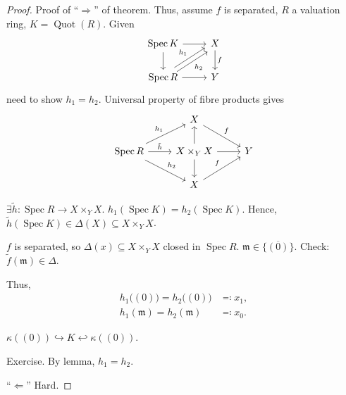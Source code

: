 \documentclass[12pt]{article}
\DeclareMathOperator{\Spec}{Spec}
\DeclareMathOperator{\Quot}{Quot}
\theoremstyle{definition}
\begin{document}
\begin{proof}
Proof of ``$\Rightarrow$'' of theorem. Thus, assume $f$ is separated, $R$ a valuation ring, $K=\Quot(R)$. Given
\[\begin{tikzcd}\Spec K\arrow[r]\arrow[d]&X\arrow[d,"f"]\\\Spec R\arrow[r]\arrow[ru,shift left,"h_1"]\arrow[ru,shift right,"h_2",swap]&Y\end{tikzcd}\]
need to show $h_1=h_2$. Universal property of fibre products gives
\[\begin{tikzcd}&X\arrow[rd,"f"]\\\Spec R\arrow[ru,"h_1"]\arrow[r,"\tilde h"]\arrow[rd,"h_2"]&X\times_YX\arrow[r]\arrow[u]\arrow[d]&Y\\&X\arrow[ru,"f"]\end{tikzcd}\]

$\exists\tilde h:\Spec R\rightarrow X\times_YX$. $h_1(\Spec K)=h_2(\Spec K)$. Hence, $\tilde h(\Spec K)\in\Delta(X)\subseteq X\times_YX$.

$f$ is separated, so $\Delta(x)\subseteq X\times_YX$ closed in $\Spec R$. $\mathfrak m\in\overline{\{(0)\}}$. Check: $\tilde f(\mathfrak m)\in\Delta$.

Thus,
\begin{align*}
h_1\big((0)\big)=h_2\big((0)\big)&\eqqcolon x_1,\\h_1(\mathfrak m)=h_2(\mathfrak m)&\eqqcolon x_0.
\end{align*}

$\kappa((0))\hookrightarrow K\hookleftarrow\kappa((0))$.

Exercise. By lemma, $h_1=h_2$.

``$\Leftarrow$'' Hard.
\end{proof}
\end{document}
